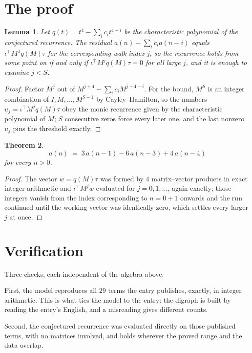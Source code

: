 \documentclass[11pt,a4paper]{article}
\theoremstyle{plain}
\newtheorem{theorem}{Theorem}
\newtheorem{lemma}[theorem]{Lemma}
\theoremstyle{definition}
\begin{document}
\section{The proof}

\begin{lemma}\label{lem:crit}
Let $q(t)=t^{4}-\sum_i c_it^{4-i}$ be the characteristic polynomial of the
conjectured recurrence. The residual $a(n)-\sum_ic_ia(n-i)$ equals
$\iota^{\!\top}M^{\,j}q(M)\tau$ for the corresponding walk index $j$, so the recurrence
holds from some point on if and only if $\iota^{\!\top}M^{j}q(M)\tau=0$ for all large $j$,
and it is enough to examine $j<S$.
\end{lemma}

\begin{proof}
Factor $M^{j}$ out of $M^{j+4}-\sum_ic_iM^{j+4-i}$. For the bound, $M^{S}$
is an integer combination of $I,M,\dots,M^{S-1}$ by Cayley--Hamilton, so the numbers
$u_j=\iota^{\!\top}M^{j}q(M)\tau$ obey the monic recurrence given by the characteristic
polynomial of $M$; $S$ consecutive zeros force every later one, and the last nonzero $u_j$
pins the threshold exactly.
\end{proof}

\begin{theorem}
\[
a(n)\;=\;3\,a(n-1) - 6\,a(n-3) + 4\,a(n-4)
\]
for every $n>0$.
\end{theorem}

\begin{proof}
The vector $w=q(M)\tau$ was formed by $4$ matrix--vector products in exact integer
arithmetic and $\iota^{\!\top}M^{j}w$ evaluated for $j=0,1,\dots$, again exactly; those
integers vanish from the index corresponding to $n=0+1$ onwards and the run continued
until the working vector was identically zero, which settles every larger $j$ at once.
\end{proof}

\section{Verification}

Three checks, each independent of the algebra above.

First, the model reproduces all $29$ terms the entry publishes, exactly, in integer
arithmetic. This is what ties the model to the entry: the digraph is built by reading the
entry's English, and a misreading gives different counts.

Second, the conjectured recurrence was evaluated directly on those published terms, with no
matrices involved, and holds wherever the proved range and the data overlap.
\end{document}
